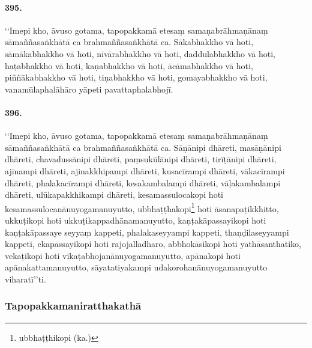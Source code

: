 \paragraph{395.} ‘‘Imepi kho, āvuso gotama, tapopakkamā etesaṃ samaṇabrāhmaṇānaṃ sāmaññasaṅkhātā ca brahmaññasaṅkhātā ca. Sākabhakkho vā hoti, sāmākabhakkho vā hoti, nīvārabhakkho vā hoti, daddulabhakkho vā hoti, haṭabhakkho vā hoti, kaṇabhakkho vā hoti, ācāmabhakkho vā hoti, piññākabhakkho vā hoti, tiṇabhakkho vā hoti, gomayabhakkho vā hoti, vanamūlaphalāhāro yāpeti pavattaphalabhojī.

\paragraph{396.} ‘‘Imepi kho, āvuso gotama, tapopakkamā etesaṃ samaṇabrāhmaṇānaṃ sāmaññasaṅkhātā ca brahmaññasaṅkhātā ca. Sāṇānipi dhāreti, masāṇānipi dhāreti, chavadussānipi dhāreti, paṃsukūlānipi dhāreti, tirīṭānipi dhāreti, ajinampi dhāreti, ajinakkhipampi dhāreti, kusacīrampi dhāreti, vākacīrampi dhāreti, phalakacīrampi dhāreti, kesakambalampi dhāreti, vāḷakambalampi dhāreti, ulūkapakkhikampi dhāreti, kesamassulocakopi hoti kesamassulocanānuyogamanuyutto, ubbhaṭṭhakopi\footnote{ubbhaṭṭhikopi (ka.)} hoti āsanapaṭikkhitto, ukkuṭikopi hoti ukkuṭikappadhānamanuyutto, kaṇṭakāpassayikopi hoti kaṇṭakāpassaye seyyaṃ kappeti, phalakaseyyampi kappeti, thaṇḍilaseyyampi kappeti, ekapassayikopi hoti rajojalladharo, abbhokāsikopi hoti yathāsanthatiko, vekaṭikopi hoti vikaṭabhojanānuyogamanuyutto, apānakopi hoti apānakattamanuyutto, sāyatatiyakampi udakorohanānuyogamanuyutto viharatī’’ti.

\subsubsection{Tapopakkamaniratthakathā}

